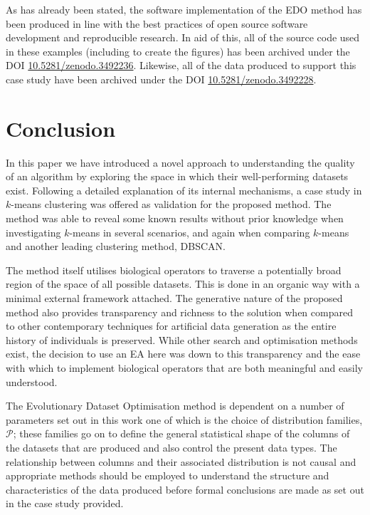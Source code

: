 As has already been stated, the software implementation of the EDO method
has been produced in line with the best practices of open source software
development and reproducible research. In aid of this, all of the source code
used in these examples (including to create the figures) has been archived
under the DOI
\href{https://doi.org/10.5281/zenodo.3492236}{10.5281/zenodo.3492236}.
Likewise, all of the data produced to support this case study have been archived
under the DOI
\href{https://doi.org/10.5281/zenodo.3492228}{10.5281/zenodo.3492228}.


\section{Conclusion}

In this paper we have introduced a novel approach to understanding the quality
of an algorithm by exploring the space in which their well-performing datasets
exist. Following a detailed explanation of its internal mechanisms, a case study
in \(k\)-means clustering was offered as validation for the proposed method.
The method was able to reveal some known results without prior knowledge when
investigating \(k\)-means in several scenarios, and again when comparing
\(k\)-means and another leading clustering method, DBSCAN.\

The method itself utilises biological operators to traverse a potentially broad
region of the space of all possible datasets. This is done in an organic way
with a minimal external framework attached. The generative nature of the
proposed method also provides transparency and richness to the solution when
compared to other contemporary techniques for artificial data generation as the
entire history of individuals is preserved. While other search and optimisation
methods exist, the decision to use an EA here was down to this transparency and
the ease with which to implement biological operators that are both meaningful
and easily understood.

The Evolutionary Dataset Optimisation method is dependent on a number of
parameters set out in this work one of which is the choice of distribution
families, \(\mathcal{P}\); these families go on to define the general
statistical shape of the columns of the datasets that are produced and also
control the present data types. The relationship between columns and their
associated distribution is not causal and appropriate methods should be employed
to understand the structure and characteristics of the data produced before
formal conclusions are made as set out in the case study provided.

